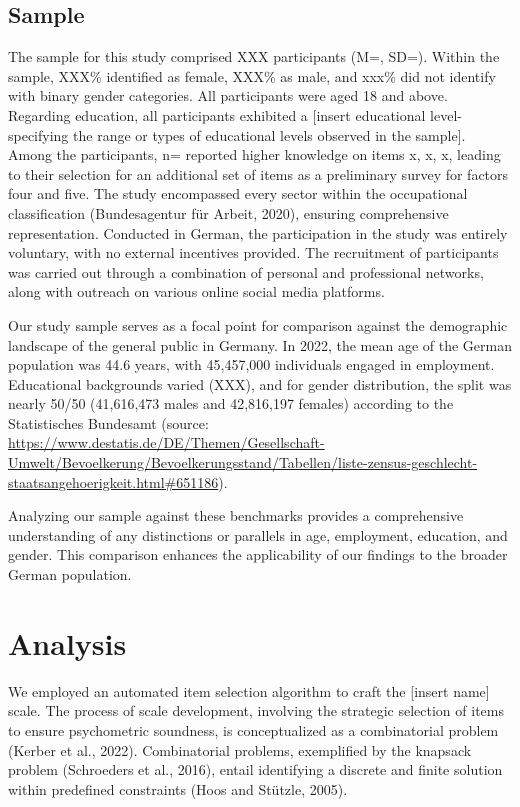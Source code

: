 \documentclass[
  12pt,
  a4paper,
  twoside]{article}
\begin{document}
\hypertarget{sample-1}{%
\subsection{Sample}\label{sample-1}}

The sample for this study comprised XXX participants (M=, SD=). Within the sample, XXX\% identified as female, XXX\% as male, and xxx\% did not identify with binary gender categories. All participants were aged 18 and above. Regarding education, all participants exhibited a {[}insert educational level- specifying the range or types of educational levels observed in the sample{]}. Among the participants, n= reported higher knowledge on items x, x, x, leading to their selection for an additional set of items as a preliminary survey for factors four and five.
The study encompassed every sector within the occupational classification (Bundesagentur für Arbeit, 2020), ensuring comprehensive representation. Conducted in German, the participation in the study was entirely voluntary, with no external incentives provided. The recruitment of participants was carried out through a combination of personal and professional networks, along with outreach on various online social media platforms.

Our study sample serves as a focal point for comparison against the demographic landscape of the general public in Germany. In 2022, the mean age of the German population was 44.6 years, with 45,457,000 individuals engaged in employment. Educational backgrounds varied (XXX), and for gender distribution, the split was nearly 50/50 (41,616,473 males and 42,816,197 females) according to the Statistisches Bundesamt (source: \url{https://www.destatis.de/DE/Themen/Gesellschaft-Umwelt/Bevoelkerung/Bevoelkerungsstand/Tabellen/liste-zensus-geschlecht-staatsangehoerigkeit.html\#651186}).

Analyzing our sample against these benchmarks provides a comprehensive understanding of any distinctions or parallels in age, employment, education, and gender. This comparison enhances the applicability of our findings to the broader German population.

\hypertarget{analysis-2}{%
\section{Analysis}\label{analysis-2}}

We employed an automated item selection algorithm to craft the {[}insert name{]} scale. The process of scale development, involving the strategic selection of items to ensure psychometric soundness, is conceptualized as a combinatorial problem (Kerber et al., 2022). Combinatorial problems, exemplified by the knapsack problem (Schroeders et al., 2016), entail identifying a discrete and finite solution within predefined constraints (Hoos and Stützle, 2005).
\end{document}
